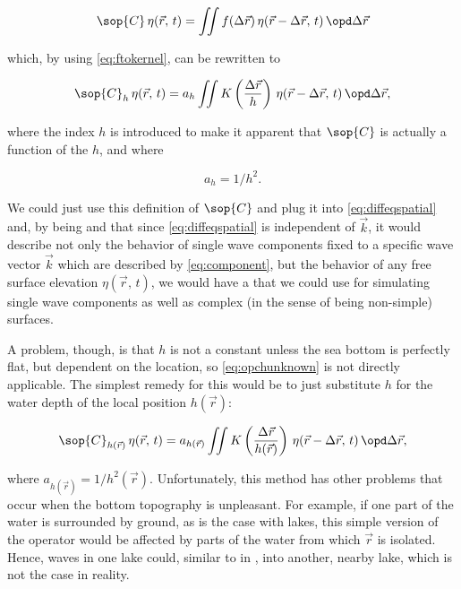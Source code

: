 \begin{equation} \label{eq:opcfintegral}
\sop{C}\,\eta(\vec{r},\,t) = \iint f(\Delta\vec{r})\,\eta(\vec{r}-\Delta\vec{r},\,t)\,\opd\Delta\vec{r}
\end{equation}

which, by using \eqref{eq:ftokernel}, can be rewritten to

\begin{equation} \label{eq:opchunknown}
\sop{C}_h\,\eta(\vec{r},\,t) = a_h\iint K\left(\frac{\Delta\vec{r}}{h}\right)\,\eta(\vec{r}-\Delta\vec{r},\,t)\,\opd\Delta\vec{r},
\end{equation}

where the index $h$ is introduced to make it apparent that $\sop{C}$ is actually a function of the  $h$, and where

\begin{equation} \label{eq:aofh}
a_h = 1/h^2.
\end{equation}

We could just use this definition of $\sop{C}$ and plug it into \eqref{eq:diffeqspatial} and, by being \naive and \assuming that since \eqref{eq:diffeqspatial} is independent of $\vec{k}$, it would describe not only the behavior of single wave components fixed to a specific wave vector $\vec{k}$ which are described by \eqref{eq:component}, but the behavior of any free surface elevation $\eta(\vec{r},\,t)$, we would have a \PDE that we could use for simulating single wave components as well as complex (in the sense of being non-simple) surfaces.

A problem, though, is that $h$ is not a constant unless the sea bottom is perfectly flat, but dependent on the location, so \eqref{eq:opchunknown} is not directly applicable. The simplest remedy for this would be to just substitute $h$ for the water depth of the local position $h(\vec{r})$:

\begin{equation} \label{eq:opchlocal}
\sop{C}_{h(\vec{r})}\,\eta(\vec{r},\,t) = a_{h(\vec{r})}\iint K\left(\frac{\Delta\vec{r}}{h(\vec{r})}\right)\,\eta(\vec{r}-\Delta\vec{r},\,t)\,\opd\Delta\vec{r},
\end{equation}

where $a_{h(\vec{r})} = 1/h^2(\vec{r})$. Unfortunately, this method has other problems that occur when the bottom topography is unpleasant. For example, if one part of the water is surrounded by ground, as is the case with lakes, this simple version of the operator would be affected by parts of the water from which $\vec{r}$ is isolated. Hence, waves in one lake could, similar to in , \tunnel into another, nearby lake, which is not the case in reality.

